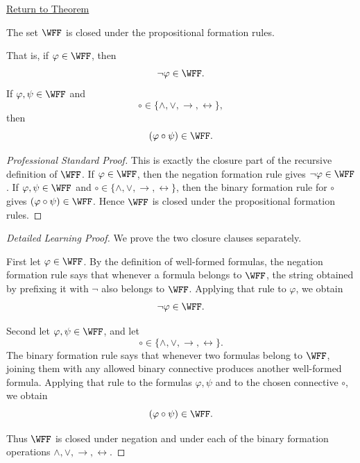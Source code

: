 \newpage
{}
\label{prf:closure-under-formation-propositional-formulas}

\begin{remark*}[Return]
\hyperref[lem:closure-under-formation-propositional-formulas]{Return to Theorem}
\end{remark*}


\begin{lemma*}
The set \(\WFF\) is closed under the propositional formation rules.

That is, if \(\varphi\in\WFF\), then
\[
\neg\varphi\in\WFF.
\]
If \(\varphi,\psi\in\WFF\) and
\[
\circ\in\{\land,\lor,\to,\leftrightarrow\},
\]
then
\[
(\varphi\circ\psi)\in\WFF.
\]
\end{lemma*}

\begin{proof}[Professional Standard Proof]
\LRAProofBodyStart
This is exactly the closure part of the recursive definition of
\(\WFF\). If \(\varphi\in\WFF\), then the negation formation rule gives
\(\neg\varphi\in\WFF\). If \(\varphi,\psi\in\WFF\) and
\(\circ\in\{\land,\lor,\to,\leftrightarrow\}\), then the binary formation
rule for \(\circ\) gives \((\varphi\circ\psi)\in\WFF\). Hence \(\WFF\) is
closed under the propositional formation rules.
\end{proof}

\begin{proof}[Detailed Learning Proof]
\LRAProofBodyStart
We prove the two closure clauses separately.

First let \(\varphi\in\WFF\). By the definition of well-formed formulas, the
negation formation rule says that whenever a formula belongs to \(\WFF\), the
string obtained by prefixing it with \(\neg\) also belongs to \(\WFF\). Applying
that rule to \(\varphi\), we obtain
\[
\neg\varphi\in\WFF.
\]

Second let \(\varphi,\psi\in\WFF\), and let
\[
\circ\in\{\land,\lor,\to,\leftrightarrow\}.
\]
The binary formation rule says that whenever two formulas belong to \(\WFF\),
joining them with any allowed binary connective produces another well-formed
formula. Applying that rule to the formulas \(\varphi,\psi\) and to the chosen
connective \(\circ\), we obtain
\[
(\varphi\circ\psi)\in\WFF.
\]

Thus \(\WFF\) is closed under negation and under each of the binary formation
operations \(\land,\lor,\to,\leftrightarrow\).
\end{proof}

